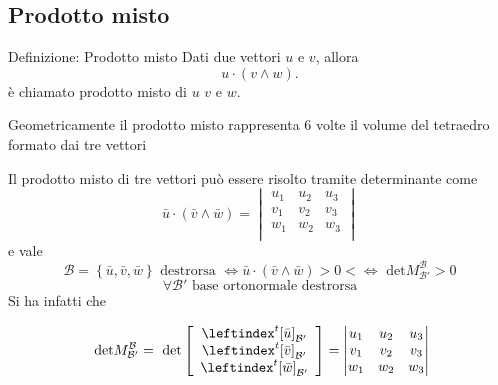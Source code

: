 \documentclass[x11names]{article}
\begin{document}
\subsection{Prodotto misto}

\begin{center}
\colorbox{myblue}{\begin{minipage}{5.75in}
\begin{blues}{Definizione: Prodotto misto}
Dati due vettori $u$ e $v$, allora
\[
u \cdot \left(v \wedge w\right)
.\] 
è chiamato prodotto misto di $u$ $v$ e  $w$. 

Geometricamente il prodotto misto rappresenta $6$ volte il volume del tetraedro formato dai tre vettori
\end{blues}
\end{minipage}}        
\end{center}

\noindent
Il prodotto misto di tre vettori può essere risolto tramite determinante come 
\[
\bar{u} \cdot \left(\bar{v} \wedge \bar{w}\right) = \begin{vmatrix}
	u_{1} & u_{2} & u_{3} \\
	v_{1} & v_{2} & v_{3} \\
	w_{1} & w_{2} & w_{3} \\
\end{vmatrix}
\]
e vale 
\[
\mathcal{B} = \left\{\bar{u},\bar{v},\bar{w}\right\} \text{ destrorsa }\Longleftrightarrow \bar{u} \cdot \left(\bar{v} \wedge \bar{w}\right) > 0< \Longleftrightarrow \text{ det}M^{\mathcal{B}}_{\mathcal{B}'} > 0
\]
\[
\forall \mathcal{B}' \text{ base ortonormale destrorsa}
\]
Si ha infatti che 

\[
 \text{ det}M^{\mathcal{B}}_{\mathcal{B}'} = \text{ det}\left[\begin{array}{c}
 	\leftindex^{t}{[\bar{u}]}_{\mathcal{B}'} \\
 	\leftindex^{t}{[\bar{v}]}_{\mathcal{B}'} \\
 	\leftindex^{t}{[\bar{w}]}_{\mathcal{B}'} \\
 \end{array}\right] = \begin{vmatrix}
 u_{1} & u_{2} & u_{3} \\
 v_{1} & v_{2} & v_{3} \\
 w_{1} & w_{2} & w_{3} \\
 \end{vmatrix}
\]



\end{document}
